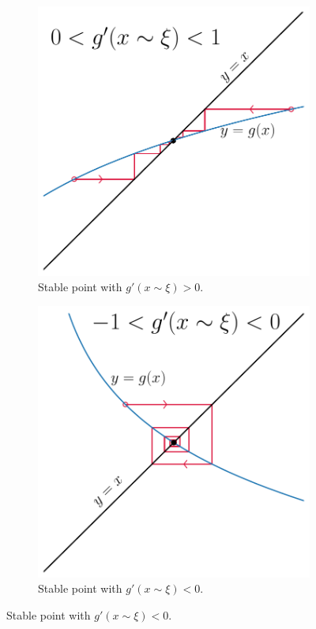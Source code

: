 \begin{figure}
\centering
\begin{subfigure}[b]{.45\linewidth}
\includegraphics[width=\linewidth]{figures/ch2_stability1.pdf}
\caption{Stable point with $g'(x\sim \xi)>0$.}\label{fig:stable1}
\end{subfigure}
\begin{subfigure}[b]{.45\linewidth}
\includegraphics[width=\linewidth]{figures/ch2_stability2.pdf}
\caption{Stable point with $g'(x\sim \xi)<0$.}\label{fig:stable2}
\end{subfigure}


\end{figure}
